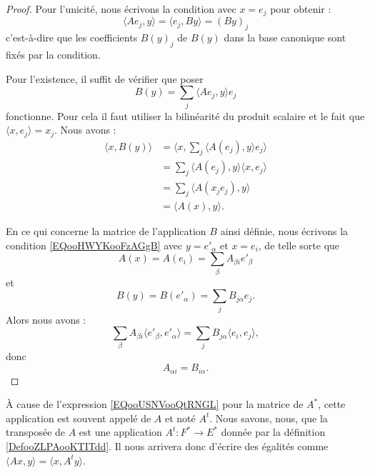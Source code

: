 \begin{proof}
    Pour l'unicité, nous écrivons la condition avec \( x=e_j\) pour obtenir :
    \begin{equation}
        \langle Ae_j, y\rangle = \langle e_j, By\rangle =(By)_j
    \end{equation}
    c'est-à-dire que les coefficients \( B(y)_j\) de \( B(y)\) dans la base canonique sont fixés par la condition.

    Pour l'existence, il suffit de vérifier que poser
    \begin{equation}
        B(y)=\sum_j\langle Ae_j, y\rangle e_j
    \end{equation}
    fonctionne. Pour cela il faut utiliser la bilinéarité du produit scalaire et le fait que \( \langle x, e_j\rangle =x_j\). Nous avons :
    \begin{subequations}
        \begin{align}
            \langle x, B(y)\rangle &=\langle x, \sum_j\langle A(e_j), y\rangle e_j\rangle \\
            &=\sum_j\langle A(e_j), y\rangle \langle x, e_j\rangle \\
            &=\sum_j\langle A(x_je_j), y\rangle \\
            &=\langle A(x), y\rangle .
        \end{align}
    \end{subequations}

En ce qui concerne la matrice de l'application \( B\) ainsi définie, nous écrivons la condition \eqref{EQooHWYKooFzAGgB} avec \( y=e'_{\alpha}\) et \( x=e_i\), de telle sorte que
\begin{equation}
    A(x)=A(e_i)=\sum_{\beta}A_{\beta i}e'_{\beta}
\end{equation}
et
\begin{equation}
    B(y)=B(e'_{\alpha})=\sum_jB_{j\alpha}e_j.
\end{equation}
Alors nous avons :
\begin{equation}
    \sum_{\beta}A_{\beta i}\langle e'_{\beta}, e'_{\alpha}\rangle =\sum_j B_{j\alpha}\langle e_i, e_j\rangle ,
\end{equation}
donc
\begin{equation}
    A_{\alpha i}=B_{i \alpha}.
\end{equation}

\end{proof}

\begin{normaltext}
    À cause de l'expression \eqref{EQooUSNVooQtRNGL} pour la matrice de \( A^*\), cette application est souvent appelé  de \( A\) et noté \( A^t\). Nous savons, nous, que la transposée de \( A\) est une application \( A^t\colon F^*\to E^*\) donnée par la définition \ref{DefooZLPAooKTITdd}. Il nous arrivera donc d'écrire des égalités comme \( \langle Ax, y\rangle=\langle x, A^ty\rangle  \).
\end{normaltext}


